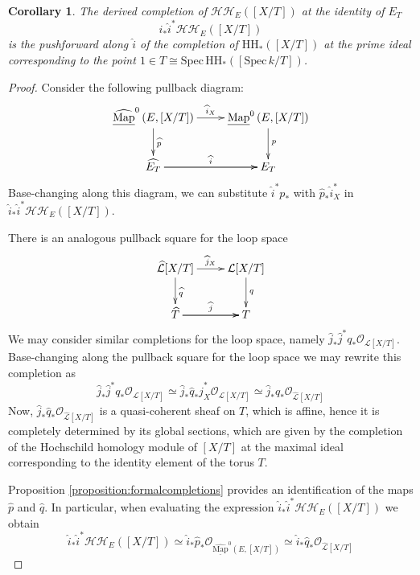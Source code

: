 \documentclass[11pt,letterpaper]{amsart}
\newtheorem{corollary}[dummy]{Corollary}
\newcommand{\cO}{\mathcal{O}}
\newcommand{\cL}{\mathcal{L}}
\newcommand{\cHH}{\mathcal{HH}}
\newcommand{\Mapo}[2]{\underline{\mathrm{Map}}^{0}\left (#1,#2\right )}
\newcommand{\fMapo}[2]{\underline{\widehat{\mathrm{Map}}}^{0}\left (#1,#2\right )}
\newcommand{\Spec}{\mathrm{S}\mathrm{pec}\,}
\begin{document}
 
\begin{corollary}\label{corollary:completionatone}
The derived completion of $\cHH_E([X/T])$ at the identity of $E_T$ 
$$\widehat{i}_\ast\widehat{i}^\ast \cHH_E([X/T])$$ 
is the pushforward along $\widehat{i}$ of the completion of $\mathrm{HH}_\ast([X/T])$ at the prime ideal corresponding to the point $1\in T \cong \Spec \mathrm{HH}_\ast([\Spec k/T])$.
\end{corollary}
\begin{proof}
Consider the following pullback diagram:
$$
\xymatrix{
\fMapo{E}{[X/T]} \ar[r]^{\widehat{i}_X}\ar[d]^{\widehat{p}} & \Mapo{E}{[X/T]}\ar[d]^{p} \\
\widehat{E_{T}}\ar[r]^{\widehat{i}} \ar[r] & E_{T}
}
$$
Base-changing along this diagram, we can substitute $\widehat{i}^\ast p_\ast$ with $\widehat{p}_\ast\widehat{i}_{X}^\ast$ in $\widehat{i}_\ast\widehat{i}^\ast \cHH_E([X/T])$. 

There is an analogous pullback square for the loop space
$$
\xymatrix{
\widehat{\cL}[X/T] \ar[r]^{\widehat{j}_X}\ar[d]^{\widehat{q}} & \cL[X/T]\ar[d]^{q} \\
\widehat{T}\ar[r]^{\widehat{j}} \ar[r] & T
}
$$
We may consider similar completions for the loop space, namely $\widehat{j}_\ast\widehat{j}^\ast q_{\ast}\cO_{\cL[X/T]}$. Base-changing along the pullback square for the loop space we may rewrite this completion as
\begin{equation}\label{eq:BCloops}
\widehat{j}_\ast\widehat{j}^\ast q_{\ast}\cO_{\cL[X/T]} \simeq \widehat{j}_\ast \widehat{q}_{\ast}\widehat{j}_{X}^{\ast}\cO_{\cL[X/T]} \simeq \widehat{j}_\ast \widehat{q}_{\ast}\cO_{\widehat{\cL}[X/T]}
\end{equation}
Now, $\widehat{j}_\ast \widehat{q}_{\ast}\cO_{\widehat{\cL}[X/T]}$ is a quasi-coherent sheaf on $T$, which is affine, hence it is completely determined by its global sections, which are given by the completion of the Hochschild homology module of $[X/T]$ at the maximal ideal corresponding to the identity element of the torus $T$. 

Proposition \ref{proposition:formalcompletions} provides an identification of the maps $\widehat{p}$ and $\widehat{q}$. In particular, when evaluating the expression $\widehat{i}_\ast\widehat{i}^\ast \cHH_E([X/T])$ we obtain
\begin{equation*}
\widehat{i}_\ast\widehat{i}^\ast \cHH_E([X/T]) \simeq \widehat{i}_\ast \widehat{p}_\ast\cO_{\fMapo{E}{[X/T]}} \simeq \widehat{i}_\ast \widehat{q}_{\ast}\cO_{\widehat{\cL}[X/T]}
\end{equation*}
\end{proof}
\end{document}
